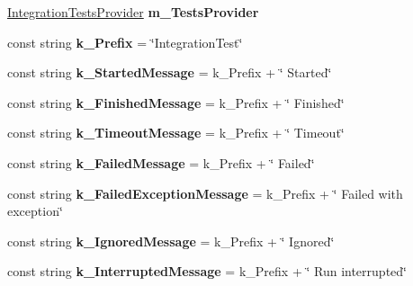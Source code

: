 \begin{DoxyCompactItemize}
\mbox{\label{class_unity_test_1_1_test_runner_a1acf1a8cedef86f18e9016031951306f}} 
\hyperlink{class_unity_test_1_1_integration_test_runner_1_1_integration_tests_provider}{Integration\+Tests\+Provider} {\bfseries m\+\_\+\+Tests\+Provider}
\item 
\mbox{\label{class_unity_test_1_1_test_runner_a31b7c453ff7ebe0886ba9f63b8d2eb9d}} 
const string {\bfseries k\+\_\+\+Prefix} = \char`\"{}Integration\+Test\char`\"{}
\item 
\mbox{\label{class_unity_test_1_1_test_runner_a2d4282bc77ce03d599e8a6cd171f1875}} 
const string {\bfseries k\+\_\+\+Started\+Message} = k\+\_\+\+Prefix + \char`\"{} Started\char`\"{}
\item 
\mbox{\label{class_unity_test_1_1_test_runner_ad77246a9a526d0ffa212b616471c3947}} 
const string {\bfseries k\+\_\+\+Finished\+Message} = k\+\_\+\+Prefix + \char`\"{} Finished\char`\"{}
\item 
\mbox{\label{class_unity_test_1_1_test_runner_a077eaded917ae466cee65dadc898ed6e}} 
const string {\bfseries k\+\_\+\+Timeout\+Message} = k\+\_\+\+Prefix + \char`\"{} Timeout\char`\"{}
\item 
\mbox{\label{class_unity_test_1_1_test_runner_a531d386c39cec615af2a0adf5f92b16c}} 
const string {\bfseries k\+\_\+\+Failed\+Message} = k\+\_\+\+Prefix + \char`\"{} Failed\char`\"{}
\item 
\mbox{\label{class_unity_test_1_1_test_runner_ab0f2d3e56a42ed2f7592e6ed7935b461}} 
const string {\bfseries k\+\_\+\+Failed\+Exception\+Message} = k\+\_\+\+Prefix + \char`\"{} Failed with exception\char`\"{}
\item 
\mbox{\label{class_unity_test_1_1_test_runner_aac7a132be225a06e7cc0567add57a55e}} 
const string {\bfseries k\+\_\+\+Ignored\+Message} = k\+\_\+\+Prefix + \char`\"{} Ignored\char`\"{}
\item 
\mbox{\label{class_unity_test_1_1_test_runner_abdd2cd25d4b11f06af31ed6145f8ba9d}} 
const string {\bfseries k\+\_\+\+Interrupted\+Message} = k\+\_\+\+Prefix + \char`\"{} Run interrupted\char`\"{}
\end{DoxyCompactItemize}
